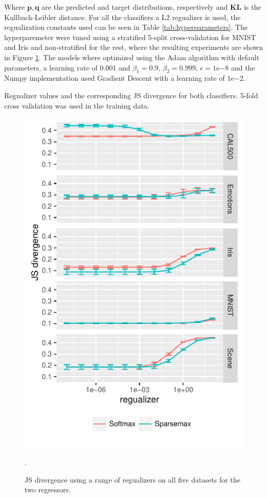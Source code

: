 Where $\mathbf{p}, \mathbf{q}$ are the predicted and target distributions, respectively and $\mathbf{KL}$ is the Kullbach-Leibler distance. For all the classifiers a L2 regualizer is used, the regualization constants used can be seen in Table \ref{tab:hyperparameters}. The hyperparemeter were tuned using a stratified 5-split cross-validation for MNIST and Iris and non-stratified for the rest, where the resulting experiments are shown in Figure \ref{fig:hyperparameters}. The models where optimized using the Adam algorithm with default parameters, a learning rate of 0.001 and $\beta_1=0.9, \, \beta_2 = 0.999, \, \epsilon = 1\mathrm{e}{-8}$ and the Numpy implementation used Gradient Descent with a learning rate of $1\mathrm{e}{-2}$.
\begin{table}[H]
\centering

\caption{Regualizer values and the corresponding JS divergence for both classifiers. 5-fold cross validation was used in the training data.}
\label{tab:hyperparameters}
\end{table}
\begin{figure}[H]
	\centering
	\includegraphics[scale=1]{figures/hyperparameter.pdf}
\caption{JS divergence using a range of regualizers on all five datasets for the two regressors.}
\label{fig:hyperparameters}.
\end{figure}

